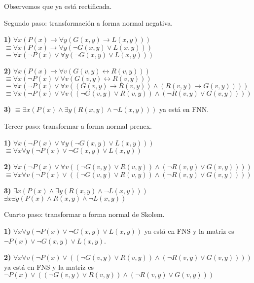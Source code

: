 \documentclass{article}
\begin{document}
Observemos que ya está rectificada.

Segundo paso: transformación a forma normal negativa.

\textbf{1)} $\forall x (P(x) \rightarrow \forall y (G(x, y) \rightarrow L(x, y)))$\\
$\equiv \forall x (P(x) \rightarrow \forall y (\lnot G(x, y) \lor L(x, y)))$\\
$\equiv \forall x (\lnot P(x) \lor \forall y (\lnot G(x, y) \lor L(x, y)))$

\textbf{2)} $\forall x (P(x) \rightarrow \forall v (G(v, y) \leftrightarrow R(v, y)))$\\
$\equiv \forall x (\lnot P(x) \lor \forall v (G(v, y) \leftrightarrow R(v, y)))$\\
$\equiv \forall x (\lnot P(x) \lor \forall v ((G(v, y) \rightarrow R(v, y)) \land (R(v, y) \rightarrow G(v, y))))$\\
$\equiv \forall x (\lnot P(x) \lor \forall v ((\lnot G(v, y) \lor R(v, y)) \land (\lnot R(v, y) \lor G(v, y))))$

\textbf{3)} $\equiv \exists x (P(x) \land \exists y (R(x, y) \land \lnot L(x, y)))$ ya está en FNN.

Tercer paso: transformar a forma normal prenex.

\textbf{1)} $\forall x (\lnot P(x) \lor \forall y (\lnot G(x, y) \lor L(x, y)))$\\
$\equiv \forall x \forall y (\lnot P(x) \lor \lnot G(x, y) \lor L(x, y))$

\textbf{2)} $\forall x (\lnot P(x) \lor \forall v ((\lnot G(v, y) \lor R(v, y)) \land (\lnot R(v, y) \lor G(v, y))))$\\
$\equiv \forall x \forall v (\lnot P(x) \lor ((\lnot G(v, y) \lor R(v, y)) \land (\lnot R(v, y) \lor G(v, y))))$

\textbf{3)} $\exists x (P(x) \land \exists y (R(x, y) \land \lnot L(x, y)))$\\
$\exists x \exists y ( P(x) \land R(x, y) \land \lnot L(x, y) )$

Cuarto paso: transformar a forma normal de Skolem.

\textbf{1)} $\forall x \forall y (\lnot P(x) \lor \lnot G(x, y) \lor L(x, y))$ ya está en FNS y la matriz es $\lnot P(x) \lor \lnot G(x, y) \lor L(x, y)$.

\textbf{2)} $\forall x \forall v (\lnot P(x) \lor ((\lnot G(v, y) \lor R(v, y)) \land (\lnot R(v, y) \lor G(v, y))))$ ya está en FNS y la matriz es $\lnot P(x) \lor ((\lnot G(v, y) \lor R(v, y)) \land (\lnot R(v, y) \lor G(v, y)))$
\end{document}
